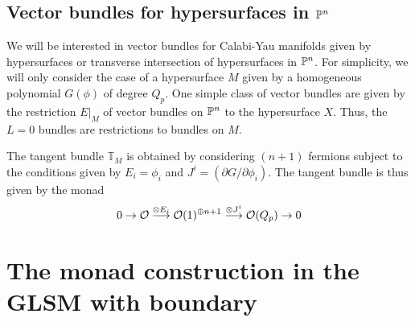 \documentclass[a4paper,12pt]{article}
\def\Bbb{\mathbb}
\def\BT{\Bbb T}
\begin{document}
\subsection{Vector bundles for hypersurfaces in $\BP^n$}

We will be interested in vector bundles for Calabi-Yau manifolds given by
hypersurfaces or transverse intersection of hypersurfaces in $\BP^n$. 
For simplicity, we will only consider the case of a hypersurface $M$ given by
a homogeneous polynomial $G(\phi)$ of degree $Q_p$.  
One simple class of vector bundles are given by
the restriction $E|_M$ of vector bundles on $\BP^n$ to the hypersurface $X$.
Thus, the $L=0$ bundles are restrictions to bundles on $M$. 

The tangent bundle $\BT_M$ is obtained by considering $(n+1)$ fermions
subject to the conditions given by $E_i=\phi_i$ and $J^i=(\partial
G/\partial \phi_i)$. The tangent bundle is thus given by the monad
$$
0\rightarrow {\cal O}\stackrel{\otimes E_i}{\longrightarrow}
 {\cal O}(1)^{\oplus n+1}\stackrel{\otimes J^i}{\longrightarrow}
{\cal O}(Q_p)\rightarrow 0
$$
 

\section{\large The monad construction in the GLSM with boundary}
\end{document}
